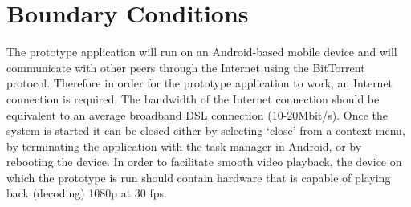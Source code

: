 \section{Boundary Conditions}
The prototype application will run on an Android-based mobile device and will communicate with other peers through the Internet using the BitTorrent protocol. Therefore in order for the prototype application to work, an Internet connection is required. The bandwidth of the Internet connection should be equivalent to an average broadband DSL connection (10-20Mbit/s). Once the system is started it can be closed either by selecting `close' from a context menu, by terminating the application with the task manager in Android, or by rebooting the device. In order to facilitate smooth video playback, the device on which the prototype is run should contain hardware that is capable of playing back (decoding) 1080p at 30 fps. 
